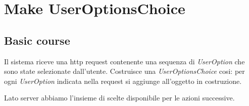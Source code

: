 \section{Make UserOptionsChoice}
\label{seq:makeUserOptionsChoice}
\subsection{Basic course}
Il sistema riceve una http request contenente una sequenza di \emph{UserOption}
che sono state selezionate dall'utente. Costruisce una
\emph{UserOptionsChoice} cosi: per ogni \emph{UserOption} indicata nella
request si aggiunge all'oggetto in costruzione.

Lato server abbiamo l'insieme di scelte disponibile per le azioni successive.